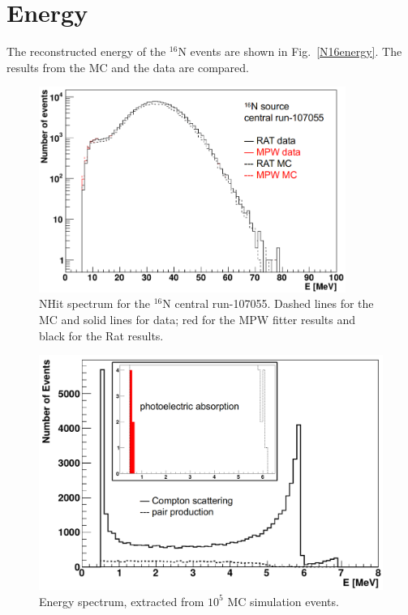 \section{Energy}

The reconstructed energy of the $^{16}$N events are shown in Fig.~\ref{N16energy}. The results from the MC and the data are compared.
\begin{figure}[htbp]
	\centering
	\includegraphics[width=10cm]{N16_nhits_107055.png}
	\caption{NHit spectrum for the $^{16}$N central run-107055. Dashed lines for the MC and solid lines for data; red for the MPW fitter results and black for the Rat results.}
	\label{N16nhits}
\end{figure}

\begin{figure}[htbp]
	\centering
	\includegraphics[width=12cm]{N16_MCenergySpectrum.png}
	\caption{Energy spectrum, extracted from $10^5$ MC simulation events.}
	\label{N16nhitsSimu}
\end{figure}


